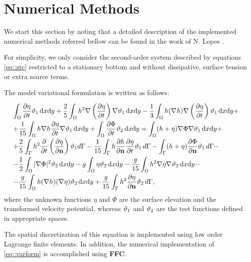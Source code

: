 

\section{Numerical Methods}
We start this section by noting that a detailed description
of  the implemented numerical methods referred bellow
can be found in the work of N. Lopes \cite{Lop07}.  

For simplicity, we only consider
the second-order system described by
equations \eqref{eq::ztc}  restricted to a stationary
bottom and without
dissipative, surface tension or extra source terms. 

The model variational formulation is written as follows:
\begin{equation}\label{eq::varform}
\renewcommand{\arraystretch}{2.0}
\begin{array}{l}
\displaystyle \int_\Omega\fpar{\eta}{t}\fba\, \dx\dy+\frac{2}{5}\int_\Omega
h^2\nabla\left(\fpar{\eta}{t}\right)\nabla\fba\, \dx\dy-\frac{1}{3}\int_\Omega
h(\nabla h)\nabla\left(\fpar{\eta}{t}\right)\fba\, \dx\dy+\\
\displaystyle +\frac{1}{15}\int_\Omega h\nabla
h\fpar{\eta}{t}\nabla\fba\, \dx\dy
+\int_\Omega \fpar{\Phi}{t}\fbb\, \dx\dy= 
\int_\Omega(h+\eta)\grad{\Phi}\grad{\fba}\, \dx\dy+
\\\displaystyle+\frac{2}{5}\int_\Gamma
h^2\fpar{}{t}\left(\fpar{\eta}{{\bf n}}\right)\fba d\Gamma -
\frac{1}{15}\int_\Gamma h\fpar{h}{\bf
n}\fpar{\eta}{t}\fba\, d\Gamma-\int_\Gamma(h+\eta)\fpar{\Phi}{\bf n}\fba\, d\Gamma-
\\
\displaystyle
-\frac{1}{2}\int_\Omega|\nabla\Phi|^2\fbb\, \dx\dy-g\int_\Omega \eta\fbb\, \dx\dy-
\frac{g}{15}\int_\Omega h^2\nabla\eta\nabla\fbb\, \dx\dy-
\\\displaystyle-\frac{g}{15}\int_\Omega h(\nabla h)(\nabla\eta)\fbb\, \dx\dy +\frac{g}{15}\int_\Gamma h^2\fpar{\eta}{\bf n}\fbb\, d\Gamma,
\end{array}
\end{equation} 
where  the unknown functions
\(\eta\) and \(\Phi\) are the surface elevation and the
transformed velocity potential, whereas  \(\vartheta_1\) and \(\vartheta_2\)  
are the test functions defined in  appropriate spaces.  
  
The spatial  discretization of this equation
is implemented  using low order  Lagrange finite elements. 
In addition, the numerical implementation of \eqref{eq::varform} is accomplished using  \textbf{FFC}. 

